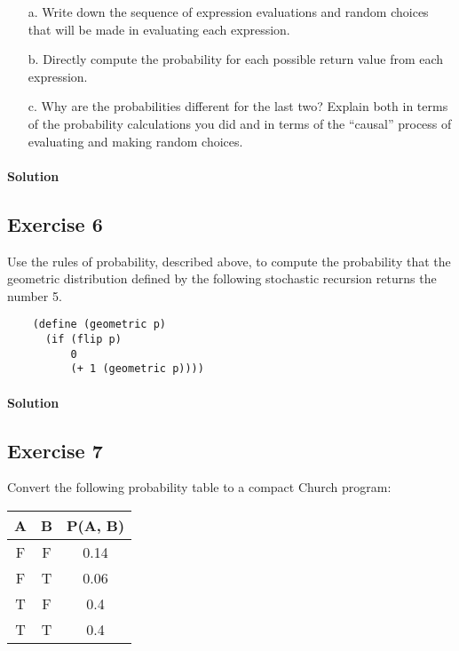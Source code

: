 \begin{itemize}
    \item[a.] Write down the sequence of expression evaluations and random choices that will be made in evaluating each expression.
    \item[b.] Directly compute the probability for each possible return value from each expression.
    \item[c.] Why are the probabilities different for the last two? Explain both in terms of the probability calculations 
        you did and in terms of the “causal” process of evaluating and making random choices.
\end{itemize}

\paragraph{Solution}


\subsection*{Exercise 6}
Use the rules of probability, described above, to compute the probability that the geometric distribution 
defined by the following stochastic recursion returns the number 5.

\begin{lstlisting}
    (define (geometric p)
      (if (flip p)
          0
          (+ 1 (geometric p))))
\end{lstlisting}

\paragraph{Solution}


\subsection*{Exercise 7}
Convert the following probability table to a compact Church program:
\begin{table}[h]
    \begin{center}
        \begin{tabular}{ccc}
            \hline
            A & B & P(A, B) \\
            \hline
            F & F & 0.14 \\
            F & T & 0.06 \\
            T & F & 0.4 \\
            T & T & 0.4 \\
            \hline
        \end{tabular}
    \end{center}
    
\end{table}

